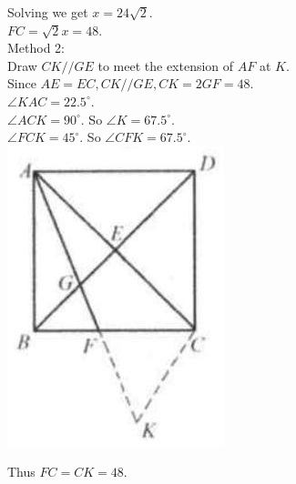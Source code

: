 \documentclass{article}
\begin{document}
Solving we get \(x=24 \sqrt{2}\).\\
\(F C=\sqrt{2} x=48\).\\
Method 2:\\
Draw \(C K / / G E\) to meet the extension of \(A F\) at \(K\).\\
Since \(A E=E C, C K / / G E, C K=2 G F=48\).\\
\(\angle K A C=22.5^{\circ}\).\\
\(\angle A C K=90^{\circ}\). So \(\angle K=67.5^{\circ}\).\\
\(\angle F C K=45^{\circ}\). So \(\angle C F K=67.5^{\circ}\).\\
\centering
\includegraphics[width=\textwidth]{images/109(1).jpg}

Thus \(F C=C K=48\).
\end{document}
